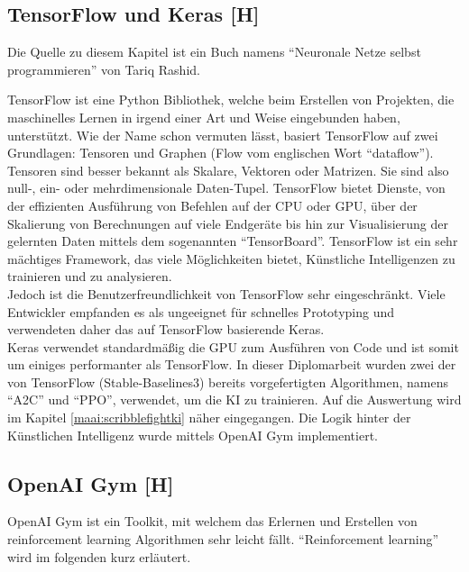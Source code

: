 \subsection{TensorFlow und Keras [H]}
Die Quelle zu diesem Kapitel ist ein Buch namens ``Neuronale Netze selbst programmieren'' von Tariq Rashid. \cite{nnselbst}

TensorFlow ist eine Python Bibliothek, welche beim Erstellen von Projekten, die maschinelles Lernen
in irgend einer Art und Weise eingebunden haben, unterstützt.
Wie der Name schon vermuten lässt, basiert TensorFlow auf zwei Grundlagen: Tensoren und Graphen (Flow
vom englischen Wort ``dataflow''). \\
Tensoren sind besser bekannt als Skalare, Vektoren oder Matrizen. Sie sind also
null-, ein- oder mehrdimensionale Daten-Tupel.
TensorFlow bietet Dienste, von der effizienten Ausführung von
Befehlen auf der CPU oder GPU, über der Skalierung von Berechnungen auf viele Endgeräte bis hin
zur Visualisierung der gelernten Daten mittels dem sogenannten ``TensorBoard''. TensorFlow ist ein
sehr mächtiges Framework, das viele Möglichkeiten bietet, Künstliche Intelligenzen zu trainieren und
zu analysieren.\\
Jedoch ist die Benutzerfreundlichkeit von TensorFlow sehr eingeschränkt. Viele Entwickler empfanden
es als ungeeignet für schnelles Prototyping und verwendeten daher das auf TensorFlow basierende Keras. \\
Keras verwendet standardmäßig die GPU zum Ausführen von Code und ist somit um einiges performanter als TensorFlow.
In dieser Diplomarbeit wurden zwei der von TensorFlow (Stable-Baselines3) bereits vorgefertigten Algorithmen,
namens ``A2C'' und ``PPO'', verwendet, um die KI zu trainieren. Auf die Auswertung wird im Kapitel \ref{maai:scribblefightki} näher
eingegangen. Die Logik hinter der Künstlichen Intelligenz
wurde mittels OpenAI Gym implementiert.

\subsection{OpenAI Gym [H]}
OpenAI Gym ist ein Toolkit, mit welchem das Erlernen und Erstellen von reinforcement learning Algorithmen
sehr leicht fällt. \cite{openaigym} ``Reinforcement learning'' wird im folgenden
kurz erläutert.

